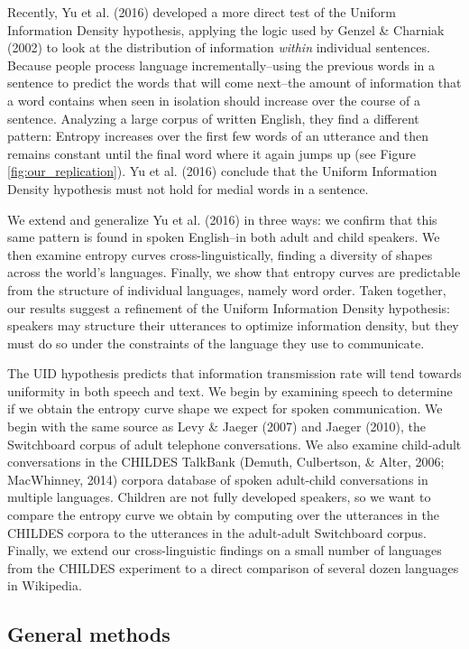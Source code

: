 \documentclass[10pt, letterpaper]{article}
\begin{document}
Recently, Yu et al. (2016) developed a more direct test of the Uniform
Information Density hypothesis, applying the logic used by Genzel \&
Charniak (2002) to look at the distribution of information \emph{within}
individual sentences. Because people process language
incrementally--using the previous words in a sentence to predict the
words that will come next--the amount of information that a word
contains when seen in isolation should increase over the course of a
sentence. Analyzing a large corpus of written English, they find a
different pattern: Entropy increases over the first few words of an
utterance and then remains constant until the final word where it again
jumps up (see Figure \ref{fig:our_replication}). Yu et al. (2016)
conclude that the Uniform Information Density hypothesis must not hold
for medial words in a sentence.

We extend and generalize Yu et al. (2016) in three ways: we confirm that
this same pattern is found in spoken English--in both adult and child
speakers. We then examine entropy curves cross-linguistically, finding a
diversity of shapes across the world's languages. Finally, we show that
entropy curves are predictable from the structure of individual
languages, namely word order. Taken together, our results suggest a
refinement of the Uniform Information Density hypothesis: speakers may
structure their utterances to optimize information density, but they
must do so under the constraints of the language they use to
communicate.

The UID hypothesis predicts that information transmission rate will tend
towards uniformity in both speech and text. We begin by examining speech
to determine if we obtain the entropy curve shape we expect for spoken
communication. We begin with the same source as Levy \& Jaeger (2007)
and Jaeger (2010), the Switchboard corpus of adult telephone
conversations. We also examine child-adult conversations in the CHILDES
TalkBank (Demuth, Culbertson, \& Alter, 2006; MacWhinney, 2014) corpora
database of spoken adult-child conversations in multiple languages.
Children are not fully developed speakers, so we want to compare the
entropy curve we obtain by computing over the utterances in the CHILDES
corpora to the utterances in the adult-adult Switchboard corpus.
Finally, we extend our cross-linguistic findings on a small number of
languages from the CHILDES experiment to a direct comparison of several
dozen languages in Wikipedia.

\hypertarget{general-methods}{%
\subsection{General methods}\label{general-methods}}
\end{document}
